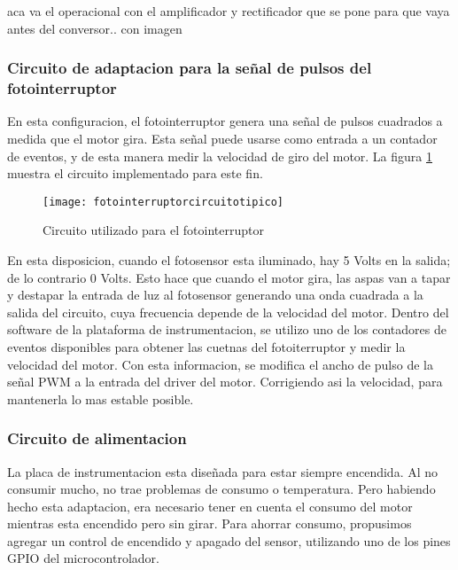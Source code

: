 aca va el operacional con el amplificador y rectificador que se pone para que vaya antes del conversor.. con imagen




\subsubsection{Circuito de adaptacion para la señal de pulsos del fotointerruptor} %
\label{ssub:circuito_de_adaptacion_para_la_señal_de_pulsos_del_fotointerruptor}


En esta configuracion, el fotointerruptor genera una señal de pulsos cuadrados a medida que el motor gira. Esta señal puede usarse como entrada a un contador de eventos, y de esta manera medir la velocidad de giro del motor. La figura \ref{fig:fotointerruptorcircuitotipico} muestra el circuito implementado para este fin. 

\begin{figure}[h]
  \centering
  \texttt{[image: fotointerruptorcircuitotipico]}
  \caption{Circuito utilizado para el fotointerruptor}\label{fig:fotointerruptorcircuitotipico}
\end{figure}

En esta disposicion, cuando el fotosensor esta iluminado, hay 5 Volts en la salida; de lo contrario 0 Volts. Esto hace que cuando el motor gira, las aspas van a tapar y destapar la entrada de luz al fotosensor generando una onda cuadrada a la salida del circuito, cuya frecuencia depende de la velocidad del motor. Dentro del software de la plataforma de instrumentacion, se utilizo uno de los contadores de eventos disponibles para obtener las cuetnas del fotoiterruptor y medir la velocidad del motor. Con esta informacion, se modifica el ancho de pulso de la señal PWM a la entrada del driver del motor. Corrigiendo asi la velocidad, para mantenerla lo mas estable posible. 


\subsubsection{Circuito de alimentacion} %
\label{ssub:circuito_de_alimentacion}

La placa de instrumentacion esta diseñada para estar siempre encendida. Al no consumir mucho, no trae problemas de consumo o temperatura. Pero habiendo hecho esta adaptacion, era necesario tener en cuenta el consumo del motor mientras esta encendido pero sin girar. Para ahorrar consumo, propusimos agregar un control de encendido y apagado del sensor, utilizando uno de los pines GPIO del microcontrolador. \\

